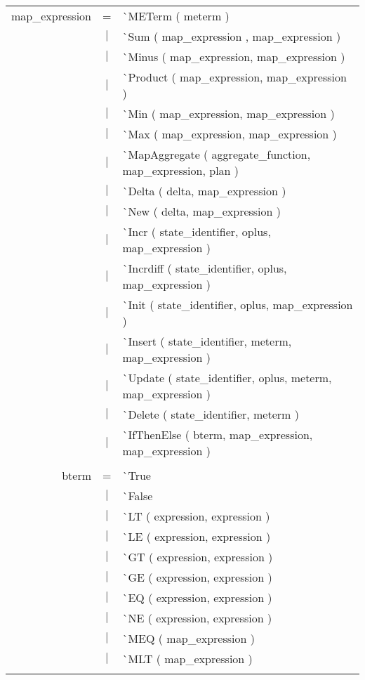 \documentclass{article}
\begin{document}
\begin{tabular}[ht] {rcl}
map\_expression &=& \`{}METerm ( meterm ) \\
&$\lvert$ & \`{}Sum ( map\_expression , map\_expression )\\
&$\lvert$ & \`{}Minus ( map\_expression,  map\_expression )\\
&$\lvert$ & \`{}Product ( map\_expression, map\_expression )\\
&$\lvert$ & \`{}Min ( map\_expression, map\_expression )\\
&$\lvert$ & \`{}Max ( map\_expression, map\_expression )\\
&$\lvert$ & \`{}MapAggregate ( aggregate\_function, map\_expression, plan )\\
&$\lvert$ & \`{}Delta ( delta,  map\_expression )\\
&$\lvert$ & \`{}New ( delta, map\_expression )\\
&$\lvert$ & \`{}Incr ( state\_identifier, oplus, map\_expression )\\
&$\lvert$ & \`{}Incrdiff ( state\_identifier, oplus, map\_expression )\\
&$\lvert$ & \`{}Init ( state\_identifier, oplus, map\_expression )\\
&$\lvert$ & \`{}Insert ( state\_identifier, meterm, map\_expression )\\
&$\lvert$ & \`{}Update ( state\_identifier, oplus, meterm, map\_expression )\\
&$\lvert$ & \`{}Delete ( state\_identifier, meterm )\\
&$\lvert$ & \`{}IfThenElse ( bterm, map\_expression, map\_expression ) \\
\\
bterm &=& \`{}True \\
&$\lvert$ & \`{}False \\
&$\lvert$ & \`{}LT ( expression,  expression )\\
&$\lvert$ & \`{}LE ( expression, expression )\\
&$\lvert$ & \`{}GT ( expression, expression )\\
&$\lvert$ & \`{}GE ( expression, expression )\\
&$\lvert$ & \`{}EQ ( expression, expression )\\
&$\lvert$ & \`{}NE ( expression, expression )\\
&$\lvert$ & \`{}MEQ ( map\_expression )\\
&$\lvert$ & \`{}MLT ( map\_expression )\\
\\

\end{tabular}
\end{document}
